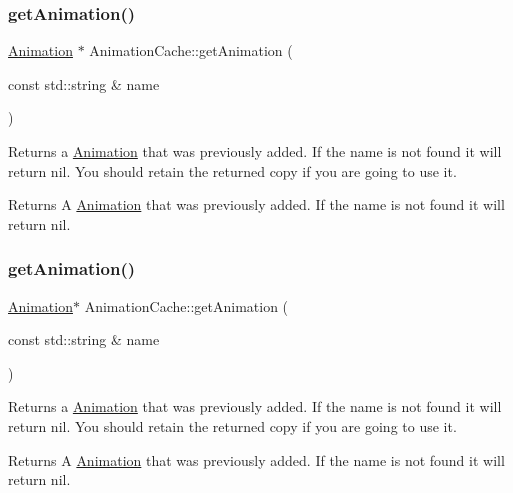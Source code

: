 \subsubsection{\texorpdfstring{get\+Animation()}{getAnimation()}\hspace{0.1cm}{\footnotesize\ttfamily [1/2]}}
{\footnotesize\ttfamily \hyperlink{classAnimation}{Animation} $\ast$ Animation\+Cache\+::get\+Animation (\begin{DoxyParamCaption}\item[{const std\+::string \&}]{name }\end{DoxyParamCaption})}

Returns a \hyperlink{classAnimation}{Animation} that was previously added. If the name is not found it will return nil. You should retain the returned copy if you are going to use it.

\begin{DoxyReturn}{Returns}
A \hyperlink{classAnimation}{Animation} that was previously added. If the name is not found it will return nil. 
\end{DoxyReturn}
\mbox{\label{classAnimationCache_aecb29573568d6b08b7ca11591732c527}} 
\subsubsection{\texorpdfstring{get\+Animation()}{getAnimation()}\hspace{0.1cm}{\footnotesize\ttfamily [2/2]}}
{\footnotesize\ttfamily \hyperlink{classAnimation}{Animation}$\ast$ Animation\+Cache\+::get\+Animation (\begin{DoxyParamCaption}\item[{const std\+::string \&}]{name }\end{DoxyParamCaption})}

Returns a \hyperlink{classAnimation}{Animation} that was previously added. If the name is not found it will return nil. You should retain the returned copy if you are going to use it.

\begin{DoxyReturn}{Returns}
A \hyperlink{classAnimation}{Animation} that was previously added. If the name is not found it will return nil. 
\end{DoxyReturn}
\mbox{\label{classAnimationCache_af742b69910d1739949ac532cfc3ea30c}} 
